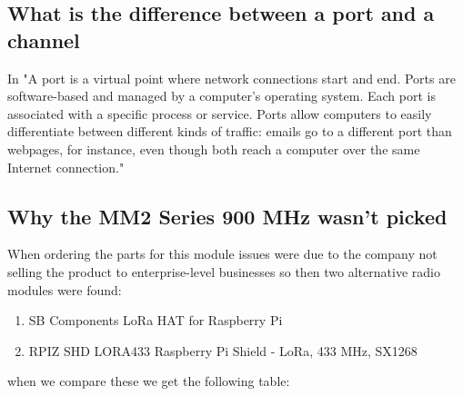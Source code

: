 \subsection{What is  the difference  between a  port and a channel}
In \cite{flare} "A port is a virtual point where network connections start and end. Ports are software-based and managed by a computer's operating system. Each port is associated with a specific process or service. Ports allow computers to easily differentiate between different kinds of traffic: emails go to a different port than webpages, for instance, even though both reach a computer over the same Internet connection."

\subsection{Why the MM2 Series 900 MHz wasn't picked}
When ordering the parts for  this module issues were due to the company not selling the product to  enterprise-level businesses so then two alternative radio modules were found:
\begin{enumerate}
    \item SB Components LoRa HAT for Raspberry Pi
    \item RPIZ SHD LORA433 Raspberry Pi Shield - LoRa, 433 MHz, SX1268
\end{enumerate}
when we compare these we get the following table:

